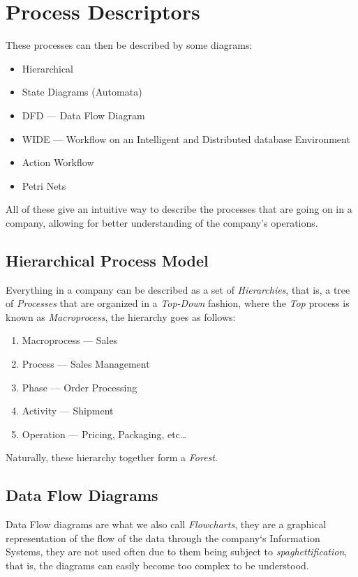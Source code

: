 \documentclass[openright, twoside, twocolumn, a4paper, 10pt]{report}
\begin{document}
\section{Process Descriptors}

These processes can then be described by some diagrams:

\begin{itemize}
	\item Hierarchical
	\item State Diagrams (Automata)
	\item DFD --- Data Flow Diagram
	\item WIDE --- Workflow on an Intelligent and Distributed database Environment
	\item Action Workflow
	\item Petri Nets
\end{itemize}

All of these give an intuitive way to describe the processes that are going on in a company, allowing for better understanding of the company's operations.

\subsection{Hierarchical Process Model}

Everything in a company can be described as a set of \emph{Hierarchies}, that is, a tree of
\emph{Processes} that are organized in a \emph{Top-Down} fashion, where the \emph{Top}
process is known as \emph{Macroprocess}, the hierarchy goes as follows:

\begin{enumerate}
	\item Macroprocess --- Sales
	\item Process --- Sales Management
	\item Phase --- Order Processing
	\item Activity --- Shipment
	\item Operation --- Pricing, Packaging, etc\dots
\end{enumerate}

Naturally, these hierarchy together form a \emph{Forest}.

\subsection{Data Flow Diagrams}

Data Flow diagrams are what we also call \emph{Flowcharts}, they are a graphical
representation of the flow of the data through the company`s Information Systems,
they are not used often due to them being subject to \emph{spaghettification},
that is, the diagrams can easily become too complex to be understood.
\end{document}
